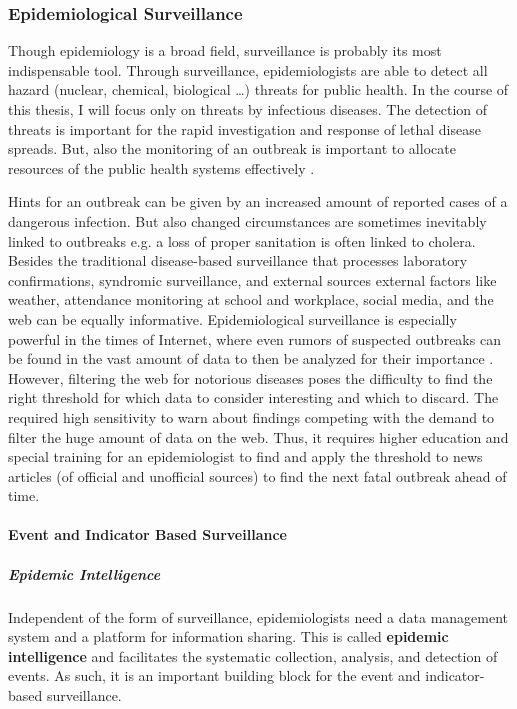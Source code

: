 \subsubsection{Epidemiological Surveillance}

Though epidemiology is a broad field, surveillance is probably its most indispensable tool. Through surveillance,
epidemiologists are able to detect all hazard (nuclear, chemical, biological \ldots) threats for public health. In the course of this thesis, I will focus only on threats by infectious diseases. The detection of threats is important for the rapid investigation and response of lethal disease spreads. But, also the monitoring of an outbreak is important to allocate resources of the public health systems effectively \citep{EarlyDetection}.

Hints for an outbreak can be given by an increased amount of reported cases of a dangerous infection. But also changed circumstances are sometimes inevitably linked to outbreaks e.g. a loss of proper sanitation is often linked to cholera. Besides the traditional disease-based surveillance that processes laboratory confirmations, syndromic surveillance, and external sources external factors like weather, attendance monitoring at school and workplace, social media, and the web\citep{EarlyDetection} can be equally informative. Epidemiological surveillance is especially powerful in the times of Internet, where even rumors of suspected outbreaks can be found in the vast amount of data to then be analyzed for their importance \citep{EpiSurv}. However, filtering the web for notorious diseases poses the difficulty to find the right threshold for which data to consider interesting and which to discard. The required high sensitivity to warn about findings competing with the demand to filter the huge amount of data on the web. Thus, it requires higher education and special training for an epidemiologist to find and apply the threshold to news articles (of official and unofficial sources) to find the next fatal outbreak ahead of time.



\paragraph{Event and Indicator Based Surveillance}

\subparagraph{Epidemic Intelligence}
Independent of the form of surveillance, epidemiologists need a data management system and a platform for information sharing. This is called \textbf{epidemic intelligence} and facilitates the systematic collection, analysis, and detection of events\citep{EarlyDetection}. As such, it is an important building block for the event and indicator-based surveillance.

